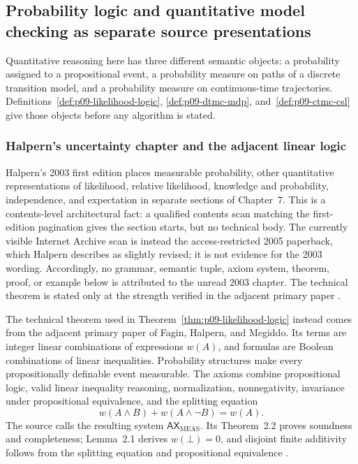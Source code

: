 
\subsection{Probability logic and quantitative model checking as separate source presentations}
\label{sec:p09-presentation-n-x-015}

Quantitative reasoning here has three different semantic objects: a
probability assigned to a propositional event, a probability measure on paths
of a discrete transition model, and a probability measure on continuous-time
trajectories.  Definitions~\ref{def:p09-likelihood-logic},
\ref{def:p09-dtmc-mdp}, and~\ref{def:p09-ctmc-csl} give those objects before any
algorithm is stated.

\subsubsection{Halpern's uncertainty chapter and the adjacent linear logic}

Halpern's 2003 first edition places measurable probability, other quantitative
representations of likelihood, relative likelihood, knowledge and probability,
independence, and expectation in separate sections of Chapter~7.  This is a
contents-level architectural fact: a qualified contents scan matching the
first-edition pagination gives the section starts, but no technical body.  The currently visible
Internet Archive scan is instead the access-restricted 2005 paperback, which
Halpern describes as slightly revised; it is not evidence for the 2003 wording.
Accordingly, no grammar, semantic tuple, axiom system, theorem, proof, or
example below is attributed to the unread 2003 chapter.  The technical theorem
is stated only at the strength verified in the adjacent primary paper
\cite{Halpern2003}.

The technical theorem used in
Theorem~\ref{thm:p09-likelihood-logic} instead comes from the adjacent primary
paper of Fagin, Halpern, and Megiddo.  Its terms are integer linear combinations
of expressions \(w(A)\), and formulas are Boolean combinations of linear
inequalities.  Probability structures make every propositionally definable
event measurable.  The axioms combine propositional logic, valid linear
inequality reasoning, normalization, nonnegativity, invariance under
propositional equivalence, and the splitting equation
\[
 w(A\land B)+w(A\land\neg B)=w(A).
\]
The source calls the resulting system
\(\mathsf{AX}_{\mathrm{MEAS}}\).  Its Theorem~2.2 proves soundness and
completeness; Lemma~2.1 derives \(w(\bot)=0\), and disjoint finite additivity
follows from the splitting equation and propositional equivalence
\cite[\S\S2--3]{FaginHalpernMegiddo1990}.

